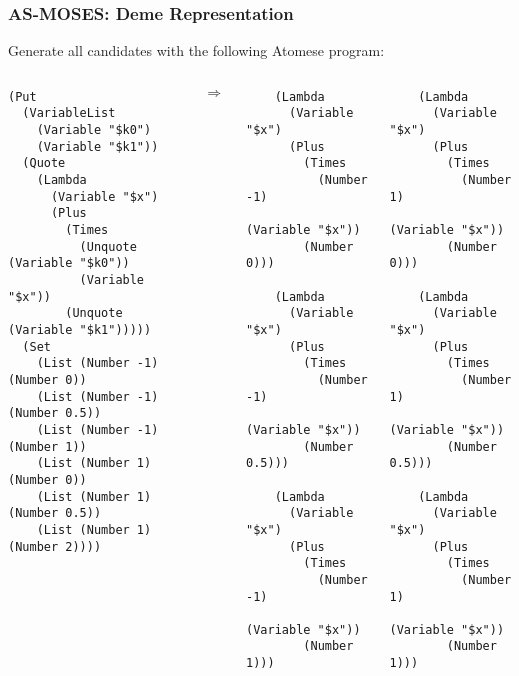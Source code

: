 \documentclass{beamer}
\begin{document}
\begin{frame}[fragile]
  \frametitle{AS-MOSES: Deme Representation}

  Generate all candidates with the following Atomese program:

\begin{columns}

  \column{2in}
  
{\tiny
\begin{verbatim}
(Put
  (VariableList
    (Variable "$k0")
    (Variable "$k1"))
  (Quote
    (Lambda
      (Variable "$x")
      (Plus
        (Times
          (Unquote (Variable "$k0"))
          (Variable "$x"))
        (Unquote (Variable "$k1")))))
  (Set  
    (List (Number -1) (Number 0))
    (List (Number -1) (Number 0.5))
    (List (Number -1) (Number 1))
    (List (Number 1) (Number 0))
    (List (Number 1) (Number 0.5))
    (List (Number 1) (Number 2))))
\end{verbatim}}

  \column{0.1in}
  $$\Rightarrow$$

  \column{1in}

{\Tiny
\begin{verbatim}
    (Lambda
      (Variable "$x")
      (Plus
        (Times
          (Number -1)
          (Variable "$x"))
        (Number 0)))

    (Lambda
      (Variable "$x")
      (Plus
        (Times
          (Number -1)
          (Variable "$x"))
        (Number 0.5)))

    (Lambda
      (Variable "$x")
      (Plus
        (Times
          (Number -1)
          (Variable "$x"))
        (Number 1)))
\end{verbatim}}

  \column{1in}

{\Tiny
\begin{verbatim}
    (Lambda
      (Variable "$x")
      (Plus
        (Times
          (Number 1)
          (Variable "$x"))
        (Number 0)))

    (Lambda
      (Variable "$x")
      (Plus
        (Times
          (Number 1)
          (Variable "$x"))
        (Number 0.5)))

    (Lambda
      (Variable "$x")
      (Plus
        (Times
          (Number 1)
          (Variable "$x"))
        (Number 1)))
\end{verbatim}}

\end{columns}

\end{frame}
\end{document}
